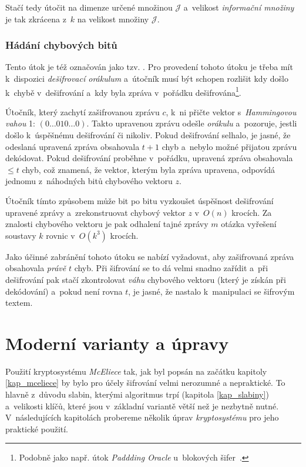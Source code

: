 \documentclass[thesis=M,czech,hidelinks]{FITthesis}[2012/06/26]
\newcommand{\0}{{\textcolor[gray]{0.75}{0}}}
\begin{document}
Stačí tedy útočit na dimenze určené množinou $\mathcal{J}$ a~velikost
\emph{informační množiny} je tak zkrácena z~$k$ na velikost množiny
$\mathcal{J}$.


\subsubsection{Hádání chybových bitů}

Tento útok je též označován jako tzv. . Pro provedení tohoto
útoku je třeba mít k~dispozici \emph{dešifrovací orákulum} a~útočník musí být
schopen rozlišit kdy došlo k~chybě v~dešifrování a~kdy byla zpráva v~pořádku
dešifrována\footnote{
    Podobně jako např. útok \emph{Paddding Oracle} u~blokových
    šifer~\cite{FIT_KRY}.
}.

Útočník, který zachytí zašifrovanou zprávu $c$, k~ni přičte vektor
s~\emph{Hammingovou vahou} 1: $\left(0\ldots010\ldots0\right)$. Takto upravenou
zprávu odešle \emph{orákulu} a~pozoruje, jestli došlo k~úspěšnému dešifrování či
nikoliv. Pokud dešifrování selhalo, je jasné, že odeslaná upravená zpráva
obsahovala $t+1$ chyb a~nebylo možné přijatou zprávu dekódovat. Pokud
dešifrování proběhne v~pořádku, upravená zpráva obsahovala $\leq t$ chyb, což
znamená, že vektor, kterým byla zpráva upravena, odpovídá jednomu z~náhodných
bitů chybového vektoru $z$.

Útočník tímto způsobem může bit po bitu vyzkoušet úspěšnost dešifrování upravené
zprávy a~zrekonstruovat chybový vektor $z$ v~$O\left( n \right)$ krocích. Za
znalosti chybového vektoru je pak odhalení tajné zprávy $m$ otázka vyřešení
soustavy $k$ rovnic v~$O\left( k^3 \right)$ krocích.

Jako účinné zabránění tohoto útoku se nabízí vyžadovat, aby zašifrovaná zpráva
obsahovala \emph{právě} $t$ chyb. Při šifrování se to dá velmi snadno zařídit
a~při dešifrování pak stačí zkontrolovat \emph{váhu} chybového vektoru (který je
získán při dekódování) a~pokud není rovna $t$, je jasné, že nastalo k~manipulaci
se šifrovým textem.



\section{Moderní varianty a úpravy}\label{kap_upravy}

Použití kryptosystému \emph{McEliece} tak, jak byl popsán na začátku kapitoly
\ref{kap_mceliece} by bylo pro účely šifrování velmi nerozumné a nepraktické. To
hlavně z~důvodu slabin, kterými algoritmus trpí (kapitola \ref{kap_slabiny})
a~velikosti klíčů, které jsou v~základní variantě větší než je nezbytně nutné.
V~následujících kapitolách probereme několik úprav \emph{kryptosystému} pro
jeho praktické použití.
\end{document}

